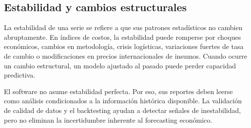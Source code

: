 \subsection{Estabilidad y cambios estructurales}

La estabilidad de una serie se refiere a que sus patrones estadísticos no cambien abruptamente. En índices de costos, la estabilidad puede romperse por choques económicos, cambios en metodología, crisis logísticas, variaciones fuertes de tasa de cambio o modificaciones en precios internacionales de insumos. Cuando ocurre un cambio estructural, un modelo ajustado al pasado puede perder capacidad predictiva.

El software no asume estabilidad perfecta. Por eso, sus reportes deben leerse como análisis condicionados a la información histórica disponible. La validación de calidad de datos y el backtesting ayudan a detectar señales de inestabilidad, pero no eliminan la incertidumbre inherente al forecasting económico.
